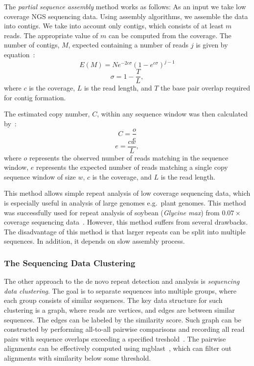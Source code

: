The \emph{partial sequence assembly} method works as follows: As an input we take low coverage NGS sequencing data. Using assembly algorithms, we assemble the data into contigs. We take into account only contigs, which consists of at least $m$ reads. The appropriate value of $m$ can be computed from the coverage. The number of contigs, $M$, expected containing a number of reads $j$ is given by equation~\cite{swaminathan2007global}:
$$E(M) = Ne^{-2c\sigma}{(1-e^{c\sigma})}^{j-1}$$
$$\sigma = 1 - \frac{T}{L},$$
where $c$ is the coverage, $L$ is the read length, and $T$ the base pair overlap required for contig formation.

The estimated copy number, $C$, within any sequence window was then calculated by~\cite{swaminathan2007global}:
$$C = \frac{o}{e}$$
$$e = \frac{cw}{L},$$
where $o$ represents the observed number of reads matching in the sequence window, $e$ represents the expected number of reads matching a single copy sequence window of size $w$, $c$ is the coverage, and $L$ is the read length.

This method allows simple repeat analysis of low coverage sequencing data, which is especially useful in analysis of large genomes e.g.\ plant genomes. This method was successfully used for repeat analysis of soybean (\textit{Glycine max}) from $0.07\times$ coverage sequencing data~\cite{swaminathan2007global}.
However, this method suffers from several drawbacks. The disadvantage of this method is that larger repeats can be split into multiple sequences. In addition, it depends on slow assembly process.

\subsubsection{The Sequencing Data Clustering}

The other approach to the de novo repeat detection and analysis is \emph{sequencing data clustering}. The goal is to separate sequences into multiple groups, where each group consists of similar sequences.
The key data structure for such clustering is a graph, where reads are vertices, and edges are between similar sequences. The edges can be labeled by the similarity score. Such graph can be constructed by performing all-to-all pairwise comparisons and recording all read pairs with sequence overlaps exceeding a specified treshold~\cite{pertea2003tigr, novak2010graph}. The pairwise alignments can be effectively computed using mgblast~\cite{pertea2003tigr}, which can filter out alignments with similarity below some threshold.

